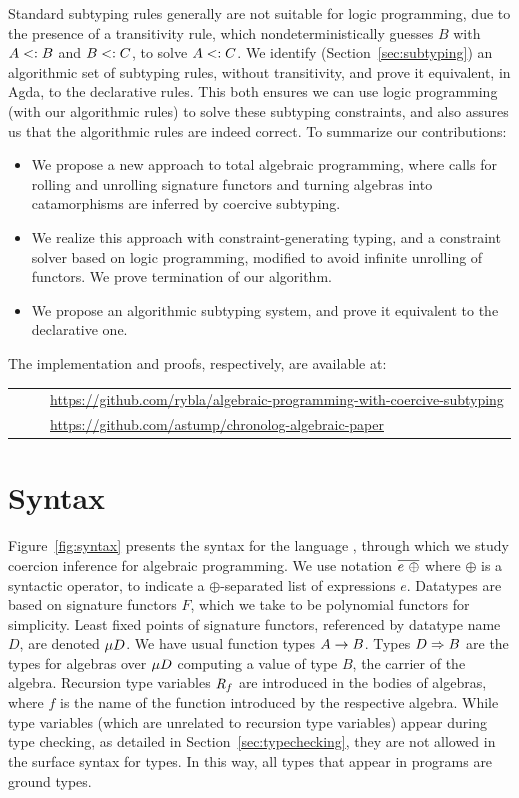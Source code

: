 \documentclass[runningheads]{llncs}
\begin{document}
Standard subtyping rules generally are not suitable for logic
programming, due to the presence of a transitivity rule, which
nondeterministically guesses $B$ with $A \mathrel{<:} B$ and $B \mathrel{<:}
C$, to solve $A \mathrel{<:} C$.  We identify
(Section~\ref{sec:subtyping}) an algorithmic set of subtyping rules,
without transitivity, and prove it equivalent, in Agda, to the
declarative rules.  This both ensures we can use logic programming
(with our algorithmic rules) to solve these subtyping constraints, and
also assures us that the algorithmic rules are indeed correct.  To
summarize our contributions:
\begin{itemize}
  \item We propose a new approach to total algebraic programming,
    where calls for rolling and unrolling signature functors
    and turning algebras into catamorphisms are inferred by coercive
    subtyping.
  \item We realize this approach with constraint-generating typing,
    and a constraint solver based on logic programming, modified
    to avoid infinite unrolling of functors. We prove termination of
    our algorithm.
  \item We propose an algorithmic subtyping system, and prove it
    equivalent to the declarative one.
\end{itemize}

The implementation and proofs, respectively, are available at:

\begin{tabular}{ll}
\ \ \ &  \url{https://github.com/rybla/algebraic-programming-with-coercive-subtyping} \\
\ \ \ &  \url{https://github.com/astump/chronolog-algebraic-paper}
\end{tabular}
\section{Syntax}

Figure~\ref{fig:syntax} presents the syntax for the language \lcata,
through which we study coercion inference for algebraic
programming. We use notation $\overline{e ~\oplus}$ where $\oplus$ is a
syntactic operator, to indicate a $\oplus$-separated list of
expressions $e$. Datatypes are based on signature functors $F$, which
we take to be polynomial functors for simplicity. Least fixed points
of signature functors, referenced by datatype name $D$, are denoted
$\mu D$.  We have usual function types $A \to B$.  Types $D \Rightarrow
B$ are the types for algebras over $\mu D$ computing a value of type
$B$, the carrier of the algebra.  Recursion type variables
$\textit{R}_{f}$ are introduced in the bodies of algebras, where $f$ is
the name of the function introduced by the respective algebra.  While
type variables (which are unrelated to recursion type variables)
appear during type checking, as detailed in
Section~\ref{sec:typechecking}, they are not allowed in the surface
syntax for types.  In this way, all types that appear in programs are
ground types.
\end{document}
